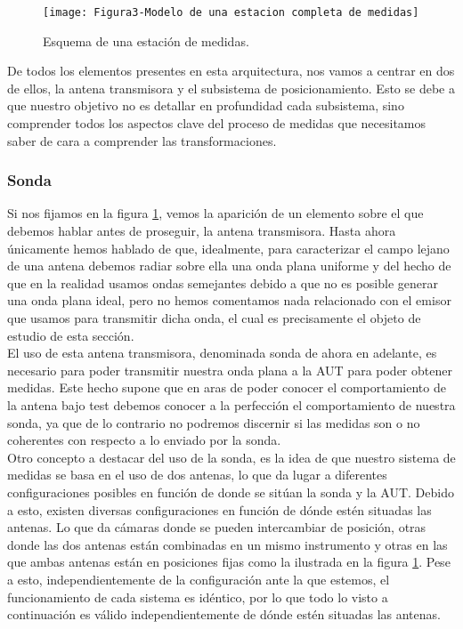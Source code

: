 \begin{figure}[h]
    \centering
    \texttt{[image: Figura3-Modelo de una estacion completa de medidas]}
    \caption{Esquema de una estación de medidas.}
    \label{Modelo-general-de-una-estación-de-medidas}
\end{figure}

\noindent
De todos los elementos presentes en esta arquitectura, nos vamos a centrar en dos de ellos, la antena transmisora y el subsistema de posicionamiento. Esto se debe a que nuestro objetivo no es detallar en profundidad cada subsistema, sino comprender todos los aspectos clave del proceso de medidas que necesitamos saber de cara a comprender las transformaciones.


\subsubsection{Sonda} 

Si nos fijamos en la figura \ref{Modelo-general-de-una-estación-de-medidas}, vemos la aparición de un elemento sobre el que debemos hablar antes de proseguir, la antena transmisora. Hasta ahora únicamente hemos hablado de que, idealmente, para caracterizar el campo lejano de una antena debemos radiar sobre ella una onda plana uniforme y del hecho de que en la realidad usamos ondas semejantes debido a que no es posible generar una onda plana ideal, pero no hemos comentamos nada relacionado con el emisor que usamos para transmitir dicha onda, el cual es precisamente el objeto de estudio de esta sección.
\\

El uso de esta antena transmisora, denominada sonda de ahora en adelante, es necesario para poder transmitir nuestra onda plana a la AUT para poder obtener medidas. Este hecho supone que en aras de poder conocer el comportamiento de la antena bajo test debemos conocer a la perfección el comportamiento de nuestra sonda, ya que de lo contrario no podremos discernir si las medidas son o no coherentes con respecto a lo enviado por la sonda.
\\

Otro concepto a destacar del uso de la sonda, es la idea de que nuestro sistema de medidas se basa en el uso de dos antenas, lo que da lugar a diferentes configuraciones posibles en función de donde se sitúan la sonda y la AUT. Debido a esto, existen diversas configuraciones en función de dónde estén situadas las antenas. Lo que da cámaras donde se pueden intercambiar de posición, otras donde las dos antenas están combinadas en un mismo instrumento y otras en las que ambas antenas están en posiciones fijas como la ilustrada en la figura \ref{Modelo-general-de-una-estación-de-medidas}. Pese a esto, independientemente de la configuración ante la que estemos, el funcionamiento de cada sistema es idéntico, por lo que todo lo visto a continuación es válido independientemente de dónde estén situadas las antenas. 


